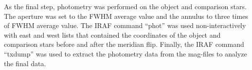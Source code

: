 As the final step, photometry was performed on the object and comparison stars. 
The aperture was set to the FWHM average value and the annulus to three times of 
FWHM average value. The IRAF command “phot” was used non-interactively with east 
and west lists that contained the coordinates of the object and comparison stars 
before and after the meridian flip. Finally, the IRAF command “txdump” was used to 
extract the photometry data from the mag-files to analyze the final data. 
